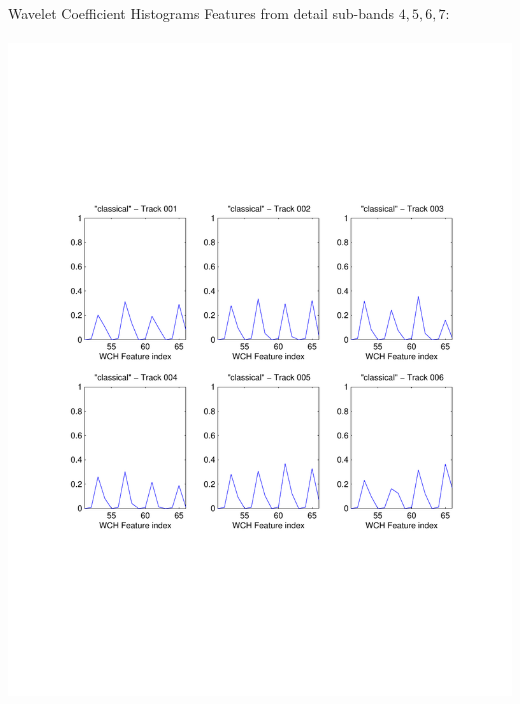 \documentclass[xcolor=dvipsnames,t]{beamer} %
\begin{document}
\begin{frame}{Wavelet Coefficient Histograms}
   Features from detail sub-bands $4,5,6,7$:\\

   ~\\[-10em]
   \includegraphics[width=\textwidth]{figures/wch_class.pdf}

\end{frame}
\end{document}
